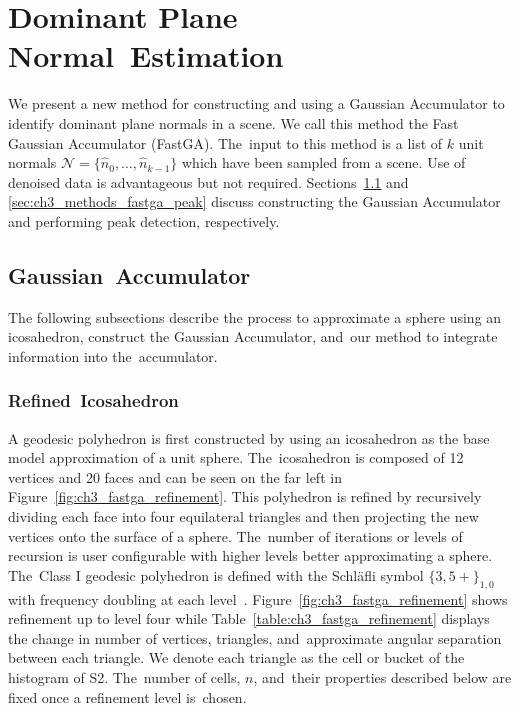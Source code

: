 \section{Dominant Plane Normal~Estimation}\label{sec:ch3_methods_fastga}

We present a new method for constructing and using a Gaussian Accumulator to identify dominant plane normals in a scene. We call this method the Fast Gaussian Accumulator (FastGA). The~input to this method is a list of $k$ unit normals $\mathcal{N} = \{\hat{n}_0, \ldots, \hat{n}_{k-1} \}$ which have been sampled from a scene. Use of denoised data is advantageous but not required. Sections~\ref{sec:ch3_methods_fastga_histogram} and \ref{sec:ch3_methods_fastga_peak} discuss constructing the Gaussian Accumulator and performing peak detection, respectively. 

\subsection{Gaussian~Accumulator}\label{sec:ch3_methods_fastga_histogram}

The following subsections describe the process to approximate a sphere using an icosahedron, construct the Gaussian Accumulator, and~our method to integrate information into the~accumulator. 

\subsubsection{Refined~Icosahedron}\label{sec:ch3_methods_fastga_ico}

A geodesic polyhedron is first constructed by using an icosahedron as the base model approximation of a unit sphere. The~icosahedron is composed of 12 vertices and 20 faces and can be seen on the far left in Figure~\ref{fig:ch3_fastga_refinement}. This polyhedron is refined by recursively dividing each face into four equilateral triangles and then projecting the new vertices onto the surface of a sphere. The~number of iterations or levels of recursion is user configurable with higher levels better approximating a sphere. The~Class I geodesic polyhedron is defined with the Schläfli symbol $\{3,5+\}_{1,0}$ with frequency doubling at each level~\cite{wenninger_spherical_1999}. Figure~\ref{fig:ch3_fastga_refinement} shows refinement up to level four while Table~\ref{table:ch3_fastga_refinement} displays the change in number of vertices, triangles, and~approximate angular separation between each triangle. We denote each triangle as the cell or bucket of the histogram of S2. The~number of cells, $n$, and~their properties described below are  fixed once a refinement level is~chosen.

